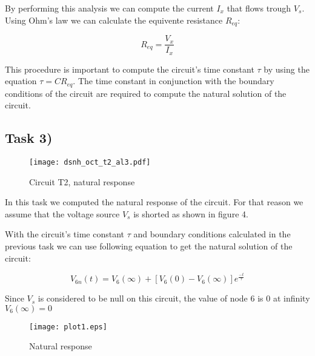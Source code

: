 By performing this analysis we can compute the current $I_x$ that flows trough $V_s$. Using Ohm's law we can calculate the equivente resistance $R_{eq}$:

\[
R_{eq}=\frac{V_x}{I_x}
\]


This procedure is important to compute the circuit's time constant $\tau$ by using the equation $\tau = CR_{eq}$. The time constant in conjunction with the boundary conditions of the circuit are required to compute the natural solution of the circuit.



\newpage
\subsection{Task 3)}
\label{subsec:task3_a}

\begin{figure}[H]
	\centering
	\texttt{[image: dsnh\_oct\_t2\_al3.pdf]}
	\caption{Circuit T2, natural response}
\label{fig:Dsnh_sim_t2}
\end{figure}

In this task we computed the natural response of the circuit. For that reason we assume that the voltage source $V_s$ is shorted as shown in figure 4.

With the circuit's time constant $\tau$ and boundary conditions calculated in the previous task we can use following equation to get the natural solution of the circuit:

\[
V_{6n}(t) = V_6(\infty) + [V_6(0) - V_6(\infty)]e^{\frac{-t}{\tau}}
\] 

Since $V_s$ is considered to be null on this circuit, the value of node 6 is 0 at infinity $V_6(\infty) = 0$ 



\begin{figure}[H]
	\centering
	\texttt{[image: plot1.eps]}
	\caption{Natural response}
\label{fig:Dsnh_sim_t2}
\end{figure}


